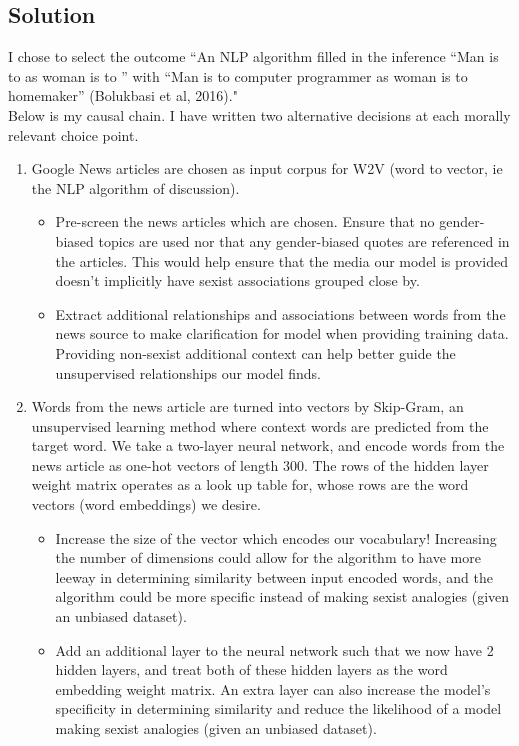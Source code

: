 \documentclass[submit]{harvardml}
\begin{document}
\subsection*{Solution}
I chose to select the outcome ``An NLP algorithm filled in the inference “Man is to as woman is to ” with “Man is to computer programmer as woman is to homemaker” (Bolukbasi et al, 2016)." \\
Below is my causal chain. I have written two alternative decisions at each morally relevant choice point.
\begin{enumerate}
    \item Google News articles are chosen as input corpus for W2V (word to vector, ie the NLP algorithm of discussion).
    \begin{itemize}
        \item Pre-screen the news articles which are chosen. Ensure that no gender-biased topics are used nor that any gender-biased quotes are referenced in the articles. This would help ensure that the media our model is provided doesn't implicitly have sexist associations grouped close by.
        \item Extract additional relationships and associations between words from the news source to make clarification for model when providing training data. Providing non-sexist additional context can help better guide the unsupervised relationships our model finds.
    \end{itemize}
    \item Words from the news article are turned into vectors by Skip-Gram, an unsupervised learning method where context words are predicted from the target word. We take a two-layer neural network, and encode words from the news article as one-hot vectors of length 300. The rows of the hidden layer weight matrix operates as a look up table for, whose rows are the word vectors (word embeddings) we desire.
    \begin{itemize}
        \item Increase the size of the vector which encodes our vocabulary! Increasing the number of dimensions could allow for the algorithm to have more leeway in determining similarity between input encoded words, and the algorithm could be more specific instead of making sexist analogies (given an unbiased dataset).
        \item Add an additional layer to the neural network such that we now have 2 hidden layers, and treat both of these hidden layers as the word embedding weight matrix. An extra layer can also increase the model's specificity in determining similarity and reduce the likelihood of a model making sexist analogies (given an unbiased dataset).

\end{itemize}
\end{enumerate}
\end{document}
